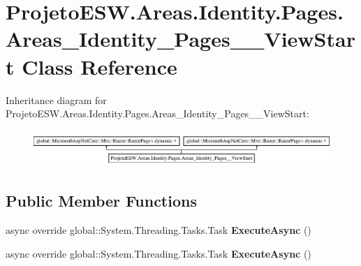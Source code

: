 \hypertarget{class_projeto_e_s_w_1_1_areas_1_1_identity_1_1_pages_1_1_areas___identity___pages_____view_start}{}\section{Projeto\+E\+S\+W.\+Areas.\+Identity.\+Pages.\+Areas\+\_\+\+Identity\+\_\+\+Pages\+\_\+\+\_\+\+View\+Start Class Reference}
\label{class_projeto_e_s_w_1_1_areas_1_1_identity_1_1_pages_1_1_areas___identity___pages_____view_start}
Inheritance diagram for Projeto\+E\+S\+W.\+Areas.\+Identity.\+Pages.\+Areas\+\_\+\+Identity\+\_\+\+Pages\+\_\+\+\_\+\+View\+Start\+:\begin{figure}[H]
\begin{center}
\leavevmode
\includegraphics[height=1.389578cm]{class_projeto_e_s_w_1_1_areas_1_1_identity_1_1_pages_1_1_areas___identity___pages_____view_start}
\end{center}
\end{figure}
\subsection*{Public Member Functions}
\begin{DoxyCompactItemize}
\item 
\mbox{\label{class_projeto_e_s_w_1_1_areas_1_1_identity_1_1_pages_1_1_areas___identity___pages_____view_start_ac4fea91667faa8eceed709bd7f8a2e5f}} 
async override global\+::\+System.\+Threading.\+Tasks.\+Task {\bfseries Execute\+Async} ()
\item 
\mbox{\label{class_projeto_e_s_w_1_1_areas_1_1_identity_1_1_pages_1_1_areas___identity___pages_____view_start_ac4fea91667faa8eceed709bd7f8a2e5f}} 
async override global\+::\+System.\+Threading.\+Tasks.\+Task {\bfseries Execute\+Async} ()
\end{DoxyCompactItemize}
